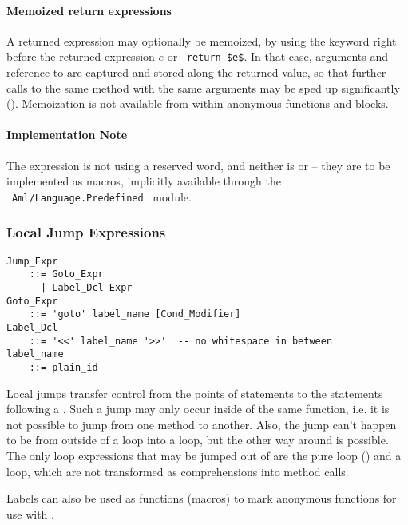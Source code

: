 \paragraph{Memoized return expressions}
A returned expression may optionally be memoized, by using the keyword  right before the returned expression $e$ or ~\lstinline!return $e$!. In that case, arguments and reference to  are captured and stored along the returned value, so that further calls to the same method with the same arguments may be sped up significantly (). Memoization is not available from within anonymous functions and blocks. 

\paragraph{Implementation Note}
The  expression is not using a reserved word, and neither is  or  -- they are to be implemented as macros, implicitly available through the ~\lstinline!Aml/Language.Predefined!~ module.






\subsubsection{Local Jump Expressions}
\label{sec:local-jump-expressions}

\grammar\begin{lstlisting}
Jump_Expr 
    ::= Goto_Expr 
      | Label_Dcl Expr
Goto_Expr 
    ::= 'goto' label_name [Cond_Modifier]
Label_Dcl
    ::= '<<' label_name '>>'  -- no whitespace in between
label_name 
    ::= plain_id
\end{lstlisting}

Local jumps transfer control from the points of  statements to the statements following a . Such a jump may only occur inside of the same function, i.e. it is not possible to jump from one method to another. Also, the jump can't happen to be from outside of a loop into a loop, but the other way around is possible. The only loop expressions that may be jumped out of are the pure loop () and a  loop, which are not transformed as comprehensions into method calls. 

Labels can also be used as functions (macros) to mark anonymous functions for use with .






